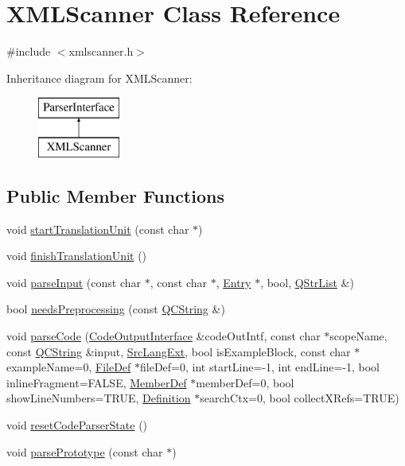 \hypertarget{class_x_m_l_scanner}{}\section{X\+M\+L\+Scanner Class Reference}
\label{class_x_m_l_scanner}


{\ttfamily \#include $<$xmlscanner.\+h$>$}

Inheritance diagram for X\+M\+L\+Scanner\+:\begin{figure}[H]
\begin{center}
\leavevmode
\includegraphics[height=2.000000cm]{class_x_m_l_scanner}
\end{center}
\end{figure}
\subsection*{Public Member Functions}
\begin{DoxyCompactItemize}
\item 
void \mbox{\hyperlink{class_x_m_l_scanner_a105515420268054f9ff54bd60793cfbb}{start\+Translation\+Unit}} (const char $\ast$)
\item 
void \mbox{\hyperlink{class_x_m_l_scanner_a00b3082e888d6bd670fdc31e52b79606}{finish\+Translation\+Unit}} ()
\item 
void \mbox{\hyperlink{class_x_m_l_scanner_ad7b6e344f24e73a8757937a806b5931a}{parse\+Input}} (const char $\ast$, const char $\ast$, \mbox{\hyperlink{class_entry}{Entry}} $\ast$, bool, \mbox{\hyperlink{class_q_str_list}{Q\+Str\+List}} \&)
\item 
bool \mbox{\hyperlink{class_x_m_l_scanner_aee7d6327a9e55cd3b965a21f707ed0a5}{needs\+Preprocessing}} (const \mbox{\hyperlink{class_q_c_string}{Q\+C\+String}} \&)
\item 
void \mbox{\hyperlink{class_x_m_l_scanner_a63895d17bafedb76a06399c80eecd840}{parse\+Code}} (\mbox{\hyperlink{class_code_output_interface}{Code\+Output\+Interface}} \&code\+Out\+Intf, const char $\ast$scope\+Name, const \mbox{\hyperlink{class_q_c_string}{Q\+C\+String}} \&input, \mbox{\hyperlink{types_8h_a9974623ce72fc23df5d64426b9178bf2}{Src\+Lang\+Ext}}, bool is\+Example\+Block, const char $\ast$example\+Name=0, \mbox{\hyperlink{class_file_def}{File\+Def}} $\ast$file\+Def=0, int start\+Line=-\/1, int end\+Line=-\/1, bool inline\+Fragment=F\+A\+L\+SE, \mbox{\hyperlink{class_member_def}{Member\+Def}} $\ast$member\+Def=0, bool show\+Line\+Numbers=T\+R\+UE, \mbox{\hyperlink{class_definition}{Definition}} $\ast$search\+Ctx=0, bool collect\+X\+Refs=T\+R\+UE)
\item 
void \mbox{\hyperlink{class_x_m_l_scanner_a77da43900e68df9a111eb45546d94fd4}{reset\+Code\+Parser\+State}} ()
\item 
void \mbox{\hyperlink{class_x_m_l_scanner_afee3f3cec27ae00c00b6fcdd78476edb}{parse\+Prototype}} (const char $\ast$)
\end{DoxyCompactItemize}



